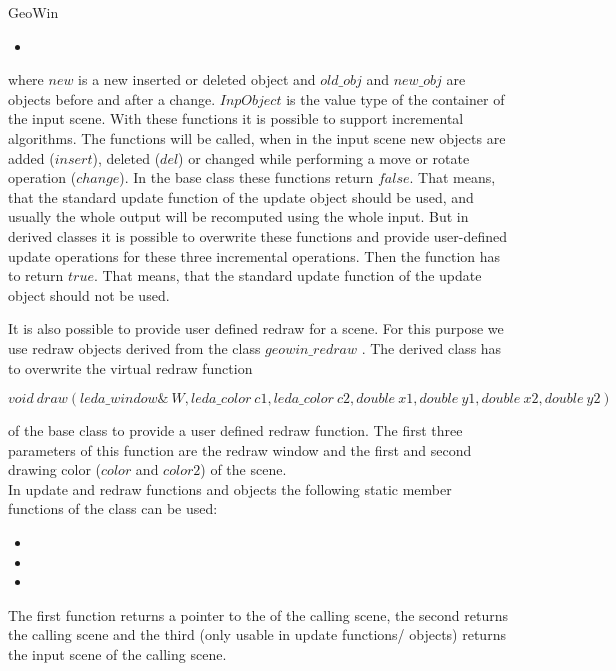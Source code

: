 \begin{ccRefClass}{GeoWin}
\begin{itemize}
     \item {}
\end{itemize}
where $new$ is a new inserted or deleted object and $old\_obj$ and $new\_obj$ are 
objects before and after a change.
$InpObject$ is the value type of the container of the input scene.
With these functions it is possible to support incremental algorithms. The functions will
be called, when in the input scene new objects are added ($insert$), deleted ($del$) or 
changed while performing a move or rotate operation ($change$).
In the base class these functions return $false$. That means, that the standard update function
of the update object should be used, and usually the whole output will be recomputed using
the whole input. 
But in derived classes it is possible to overwrite
these functions and provide user-defined update operations for these three incremental
operations. Then the function has to return $true$.
That means, that the standard update function of the update object should not be used.    
 
It is also possible to provide user defined redraw for a scene.
For this purpose we use redraw objects derived from the class $geowin\_redraw$ .
The derived class has to overwrite the virtual redraw function

     $void \ draw(leda\_window\& \ W,leda\_color \ c1,leda\_color \ c2,double \ x1,double \ y1,double \ x2,double \ y2)$
     
of the base class to provide a user defined redraw function. The first three parameters
of this function are the redraw window and the first and second drawing color ($color$ 
and $color2$) of the scene. \\
In update and redraw functions and objects the following static member functions 
of the  class can be used:
\begin{itemize}
    \item {}
    
    \item {}
    
    \item {}
\end{itemize}   
The first function returns a pointer to the  of the calling scene,
the second returns the calling scene and the third (only usable in update functions/
objects) returns the input scene of the calling scene.


\end{ccRefClass}
